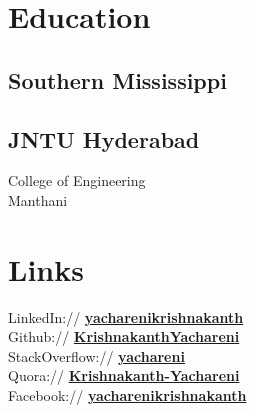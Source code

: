 \documentclass[]{kk-resume-openfont}
\begin{document}
%
%
\lastupdated

%
%

%
%

\begin{minipage}[t]{0.33\textwidth} 


\section{Education} 

\subsection{Southern Mississippi}
\sectionsep

\subsection{JNTU Hyderabad}
College of Engineering \\
Manthani\\
\sectionsep


\section{Links} 
LinkedIn://  \href{https://www.linkedin.com/in/yacharenikrishnakanth/}{\bf yacharenikrishnakanth} \\
Github:// \href{https://github.com/KrishnakanthYachareni}{\bf KrishnakanthYachareni} \\
StackOverflow://  \href{https://stackoverflow.com/users/6436720/yachareni-krishnakanth}{\bf yachareni} \\
Quora://  \href{https://www.quora.com/profile/Krishnakanth-Yachareni}{\bf Krishnakanth-Yachareni} \\
Facebook:// \href{https://www.facebook.com/yacharenikrishnakanth/}{\bf yacharenikrishnakanth} \\


\end{minipage}
\end{document}
